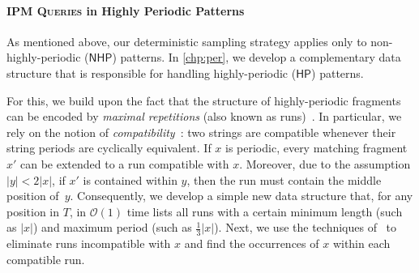 \documentclass[a4paper]{article}
\theoremstyle{definition}
\theoremstyle{remark}
\newcommand{\IPM}{\textsc{IPM Queries}\xspace}
\newcommand{\N}{\mathsf{NHP}}
\newcommand{\HP}{\mathsf{HP}}
\newcommand{\Oh}{\mathcal{O}}
\begin{document}
\paragraph{\IPM in Highly Periodic Patterns}
As mentioned above, our deterministic sampling strategy applies only to non-highly-periodic ($\N$) patterns.
In \cref{chp:per}, we develop a complementary data structure that is responsible for handling highly-periodic ($\HP$) patterns.

For this, we build upon the fact that the structure of highly-periodic fragments can be encoded by \emph{maximal repetitions} (also known as runs)~\cite{DBLP:journals/dam/Main89,DBLP:conf/focs/KolpakovK99,DBLP:journals/siamcomp/BannaiIINTT17}.
In particular, we rely on the notion of \emph{compatibility}~\cite{DBLP:journals/tcs/CrochemoreIKRRW14}: two strings are compatible whenever their 
string periods are cyclically equivalent.
If $x$ is periodic, every matching fragment $x'$ can be extended to a run compatible with $x$.
Moreover, due to the assumption $|y|<2|x|$, if $x'$ is contained within $y$, then the run must contain the middle position of~$y$.
Consequently, we develop a simple new data structure that, for any position in $T$, in $\Oh(1)$ time  
lists all runs with a certain minimum length (such as $|x|$) and maximum period (such as $\frac13|x|$). 
Next, we use the techniques of~\cite{DBLP:journals/tcs/CrochemoreIKRRW14} to eliminate runs incompatible with $x$ 
and find the occurrences of $x$ within each compatible run.
\end{document}
